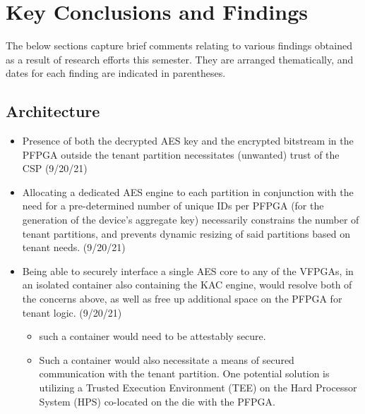 \section{Key Conclusions and Findings}\label{sec:Findings}
The below sections capture brief comments relating to various findings obtained as a result of research efforts this semester. They are arranged thematically, and dates for each finding are indicated in parentheses.

\subsection{Architecture}\label{subsec:Architecture}
\begin{itemize}
    \item Presence of both the decrypted AES key and the encrypted bitstream in the PFPGA outside the tenant partition necessitates (unwanted) trust of the CSP (9/20/21)
    \item Allocating a dedicated AES engine to each partition in conjunction with the need for a pre-determined number of unique IDs per PFPGA (for the generation of the device's aggregate key) necessarily constrains the number of tenant partitions, and prevents dynamic resizing of said partitions based on tenant needs. (9/20/21)
    \item Being able to securely interface a single AES core to any of the VFPGAs, in an isolated container also containing the KAC engine, would resolve both of the concerns above, as well as free up additional space on the PFPGA for tenant logic. (9/20/21)
    \begin{itemize}
        \item such a container would need to be attestably secure.
        \item Such a container would also necessitate a means of secured communication with the tenant partition. One potential solution is utilizing a Trusted Execution Environment (TEE) on the Hard Processor System (HPS) co-located on the die with the PFPGA.
    \end{itemize}
\end{itemize}


